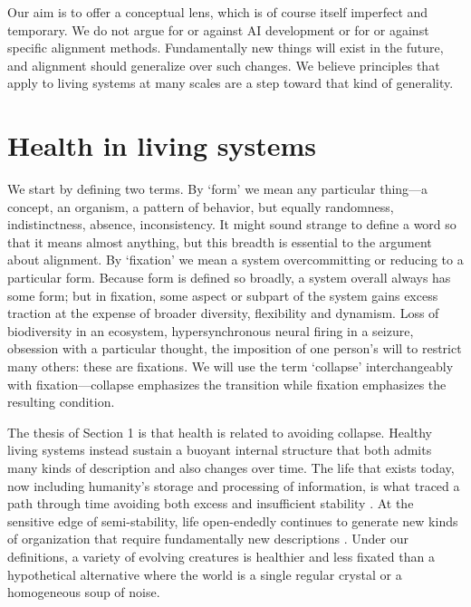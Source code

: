 \documentclass[11pt]{article}
\begin{document}
Our aim is to offer a conceptual lens, which is of course itself imperfect and temporary. We do not argue for or against AI development or for or against specific alignment methods. Fundamentally new things will exist in the future, and alignment should generalize over such changes. We believe principles that apply to living systems at many scales are a step toward that kind of generality.



\section{Health in living systems}

We start by defining two terms. By `form' we mean any particular thing---a concept, an organism, a pattern of behavior, but equally randomness, indistinctness, absence, inconsistency. It might sound strange to define a word so that it means almost anything, but this breadth is essential to the argument about alignment. By `fixation' we mean a system overcommitting or reducing to a particular form. Because form is defined so broadly, a system overall always has some form; but in fixation, some aspect or subpart of the system gains excess traction at the expense of broader diversity, flexibility and dynamism. Loss of biodiversity in an ecosystem, hypersynchronous neural firing in a seizure, obsession with a particular thought, the imposition of one person's will to restrict many others: these are fixations. We will use the term `collapse' interchangeably with fixation---collapse emphasizes the transition while fixation emphasizes the resulting condition. 

The thesis of Section 1 is that health is related to avoiding collapse. Healthy living systems instead sustain a buoyant internal structure that both admits many kinds of description and also changes over time. The life that exists today, now including humanity's storage and processing of information, is what traced a path through time avoiding both excess and insufficient stability \citep{schrodinger1944what, prigogine1984order, maturana2012autopoiesis}. At the sensitive edge of semi-stability, life open-endedly continues to generate new kinds of organization that require fundamentally new descriptions \citep{kauffman1992origins, stanley2017open, canguilhem1966normal, langton1990computation}. Under our definitions, a variety of evolving creatures is healthier and less fixated than a hypothetical alternative where the world is a single regular crystal or a homogeneous soup of noise.
\end{document}
